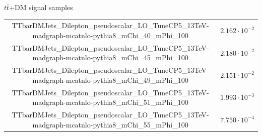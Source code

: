 \documentclass[8pt]{beamer}
\begin{document}
\begin{frame}{$t \bar t$+DM signal samples}
\begin{table}
\begin{center}
{\begin{tabular}{ c|c }
 TTbarDMJets\_Dilepton\_pseudoscalar\_LO\_TuneCP5\_13TeV-madgraph-mcatnlo-pythia8\_mChi\_40\_mPhi\_100 & $2.162 \cdot 10^{-2}$ \\
 TTbarDMJets\_Dilepton\_pseudoscalar\_LO\_TuneCP5\_13TeV-madgraph-mcatnlo-pythia8\_mChi\_45\_mPhi\_100 & $2.180 \cdot 10^{-2}$ \\
 TTbarDMJets\_Dilepton\_pseudoscalar\_LO\_TuneCP5\_13TeV-madgraph-mcatnlo-pythia8\_mChi\_49\_mPhi\_100 & $2.151 \cdot 10^{-2}$ \\
 TTbarDMJets\_Dilepton\_pseudoscalar\_LO\_TuneCP5\_13TeV-madgraph-mcatnlo-pythia8\_mChi\_51\_mPhi\_100 & $1.993 \cdot 10^{-3}$ \\
 TTbarDMJets\_Dilepton\_pseudoscalar\_LO\_TuneCP5\_13TeV-madgraph-mcatnlo-pythia8\_mChi\_55\_mPhi\_100 & $7.750 \cdot 10^{-4}$ \\
 \hline
\end{tabular}
}
\end{center}
\end{table}
\end{frame}
\end{document}
